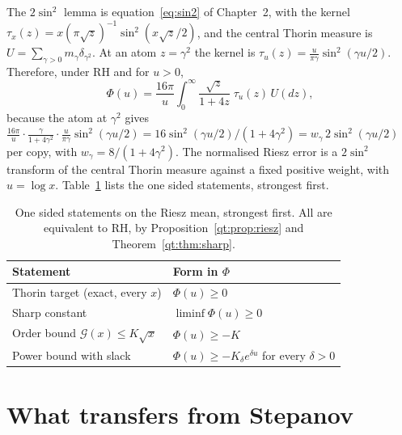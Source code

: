 The $2\sin^2$ lemma is equation~\eqref{eq:sin2} of Chapter~2, with the kernel $\tau_x(z)=x(\pi\sqrt z)^{-1}\sin^2(x\sqrt z/2)$, and the central Thorin measure is $U=\sum_{\gamma>0}m_\gamma\delta_{\gamma^2}$. At an atom $z=\gamma^2$ the kernel is $\tau_u(z)=\frac u{\pi\gamma}\sin^2(\gamma u/2)$. Therefore, under RH and for $u>0$,
\begin{equation}\label{st:eq:thorinform}
\Phi(u)=\frac{16\pi}u\int_0^\infty\frac{\sqrt z}{1+4z}\;\tau_u(z)\,U(dz),
\end{equation}
because the atom at $\gamma^2$ gives $\frac{16\pi}u\cdot\frac\gamma{1+4\gamma^2}\cdot\frac u{\pi\gamma}\sin^2(\gamma u/2)=16\sin^2(\gamma u/2)/(1+4\gamma^2)=w_\gamma\,2\sin^2(\gamma u/2)$ per copy, with $w_\gamma=8/(1+4\gamma^2)$. The normalised Riesz error is a $2\sin^2$ transform of the central Thorin measure against a fixed positive weight, with $u=\log x$. Table~\ref{st:tab:forms} lists the one sided statements, strongest first.
\begin{table}[h]\centering\small
\begin{tabular}{ll}
\toprule
Statement & Form in $\Phi$\\
\midrule
Thorin target (exact, every $x$) & $\Phi(u)\ge0$\\
Sharp constant & $\liminf\Phi(u)\ge0$\\
Order bound $\mathcal G(x)\le K\sqrt x$ & $\Phi(u)\ge-K$\\
Power bound with slack & $\Phi(u)\ge-K_\delta e^{\delta u}$ for every $\delta>0$\\
\bottomrule
\end{tabular}
\caption{One sided statements on the Riesz mean, strongest first. All are equivalent to RH, by Proposition~\ref{qt:prop:riesz} and Theorem~\ref{qt:thm:sharp}.}\label{st:tab:forms}
\end{table}

\section{What transfers from Stepanov}\label{st:sec:transfer}
